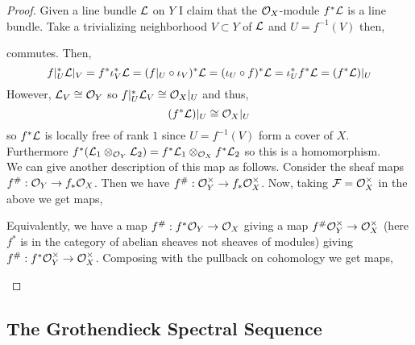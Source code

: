 \documentclass[12pt]{extarticle}
\theoremstyle{definition}
\newcommand{\F}{\mathcal{F}}
\begin{document}
\begin{proof}
Given a line bundle $\mathcal{L}$ on $Y$ I claim that the $\mathcal{O}_{X}$-module $f^* \mathcal{L}$ is a line bundle. Take a trivializing neighborhood $V \subset Y$ of $\mathcal{L}$ and $U = f^{-1}(V)$ then,
\begin{center}
\end{center}
commutes. Then,
\[ f|_U^* \mathcal{L}|_V = f^* \iota_V^* \mathcal{L} = (f|_U \circ \iota_V)^* \mathcal{L} = (\iota_U \circ f)^* \mathcal{L} = \iota_U^* f^* \mathcal{L} = (f^* \mathcal{L})|_U \]
However, $\mathcal{L}_V \cong \mathcal{O}_{Y}$ so $f|_U^* \mathcal{L}_V \cong \mathcal{O}_{X}|_U$ and thus,
\[ (f^* \mathcal{L})|_U \cong \mathcal{O}_{X}|_U \]
so $f^* \mathcal{L}$ is locally free of rank $1$ since $U = f^{-1}(V)$ form a cover of $X$.
Furthermore $f^* (\mathcal{L}_1 \otimes_{\mathcal{O}_{Y}} \mathcal{L}_2) = f^* \mathcal{L}_1 \otimes_{\mathcal{O}_{X}} f^* \mathcal{L}_2$ so this is a homomorphism.
\bigskip\\
We can give another description of this map as follows. Consider the sheaf maps $f^\# : \mathcal{O}_{Y} \to f_* \mathcal{O}_{X}$. Then we have $f^\# : \mathcal{O}_{Y}^\times \to f_* \mathcal{O}_{X}^\times$. Now, taking $\F = \struct{X}^\times$ in the above we get maps,
\begin{center}
\end{center}
Equivalently, we have a map $f^\# : f^* \mathcal{O}_{Y} \to \mathcal{O}_{X}$ giving a map $f^\# \mathcal{O}_{Y}^\times \to \mathcal{O}_{X}^\times$ (here $f^*$ is in the category of abelian sheaves not sheaves of modules) giving $f^\# : f^* \mathcal{O}_{Y}^\times \to \mathcal{O}_{X}^\times$. Composing with the pullback on cohomology we get maps,
\begin{center}
\end{center}
\end{proof}

\subsection{The Grothendieck Spectral Sequence}
\end{document}
